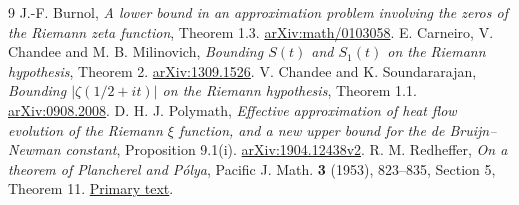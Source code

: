 \documentclass[11pt]{article}
\begin{document}
\clearpage
\begin{thebibliography}{9}\small
{}
J.-F. Burnol, \emph{A lower bound in an approximation problem involving
the zeros of the Riemann zeta function}, Theorem 1.3.
\href{https://arxiv.org/abs/math/0103058}{arXiv:math/0103058}.
E. Carneiro, V. Chandee and M. B. Milinovich,
\emph{Bounding \(S(t)\) and \(S_1(t)\) on the Riemann hypothesis},
Theorem 2. \href{https://arxiv.org/abs/1309.1526}{arXiv:1309.1526}.
V. Chandee and K. Soundararajan,
\emph{Bounding \(|\zeta(1/2+it)|\) on the Riemann hypothesis},
Theorem 1.1. \href{https://arxiv.org/abs/0908.2008}{arXiv:0908.2008}.
D. H. J. Polymath, \emph{Effective approximation of heat flow evolution
of the Riemann $\xi$ function, and a new upper bound for the de
Bruijn--Newman constant}, Proposition 9.1(i).
\href{https://arxiv.org/abs/1904.12438v2}{arXiv:1904.12438v2}.
R. M. Redheffer, \emph{On a theorem of Plancherel and P\'olya},
Pacific J. Math. \textbf{3} (1953), 823--835, Section 5, Theorem 11.
\href{https://msp.org/pjm/1953/3-4/pjm-v3-n4-p11-s.pdf}{Primary text}.
\end{thebibliography}
\end{document}
